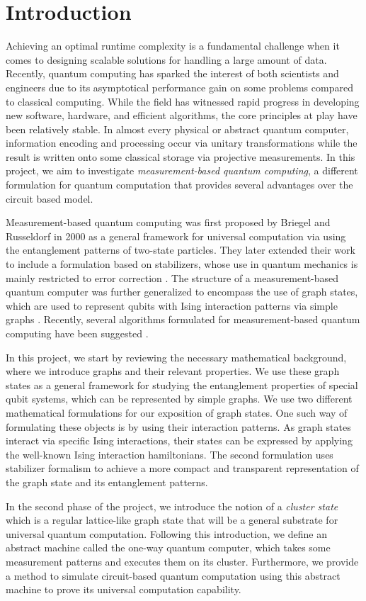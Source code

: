 \section{Introduction}

Achieving an optimal runtime complexity is a fundamental challenge when it comes to designing scalable solutions for handling a large amount of data\cite{sipser13}. Recently, quantum computing has sparked the interest of both scientists and engineers due to its asymptotical performance gain on some problems compared to classical computing. While the field has witnessed rapid progress in developing new software, hardware, and efficient algorithms, the core principles at play have been relatively stable. In almost every physical or abstract quantum computer, information encoding and processing occur via unitary transformations while the result is written onto some classical storage via projective measurements\cite{Nielsen2009}. In this project, we aim to investigate \emph{measurement-based quantum computing}, a different formulation for quantum computation that provides several advantages over the circuit based model.

Measurement-based quantum computing was first proposed by Briegel and Russeldorf in 2000 \cite{Briegel_2001} as a general framework for universal computation via using the entanglement patterns of two-state particles. They later extended their work to include a formulation based on stabilizers, whose use in quantum mechanics is mainly restricted to error correction \cite{Nielsen2009, quant-ph/9705052}. The structure of a measurement-based quantum computer was further generalized to encompass the use of graph states, which are used to represent qubits with Ising interaction patterns via simple graphs \cite{hein2006}. Recently, several algorithms formulated for measurement-based quantum computing have been suggested \cite{keith2014, debeaudrap2008theory, Fitzsimons2017}.

In this project, we start by reviewing the necessary mathematical background, where we introduce graphs and their relevant properties. We use these graph states as a general framework for studying the entanglement properties of special qubit systems, which can be represented by simple graphs. We use two different mathematical formulations for our exposition of graph states. One such way of formulating these objects is by using their interaction patterns. As graph states interact via specific Ising interactions, their states can be expressed by applying the well-known Ising interaction hamiltonians\cite{ichikawa2013}. The second formulation uses stabilizer formalism to achieve a more compact and transparent representation of the graph state and its entanglement patterns.

In the second phase of the project, we introduce the notion of a \emph{cluster state} which is a regular lattice-like graph state that will be a general substrate for universal quantum computation. Following this introduction, we define an abstract machine called the one-way quantum computer, which takes some measurement patterns and executes them on its cluster. Furthermore, we provide a method to simulate circuit-based quantum computation using this abstract machine to prove its universal computation capability.